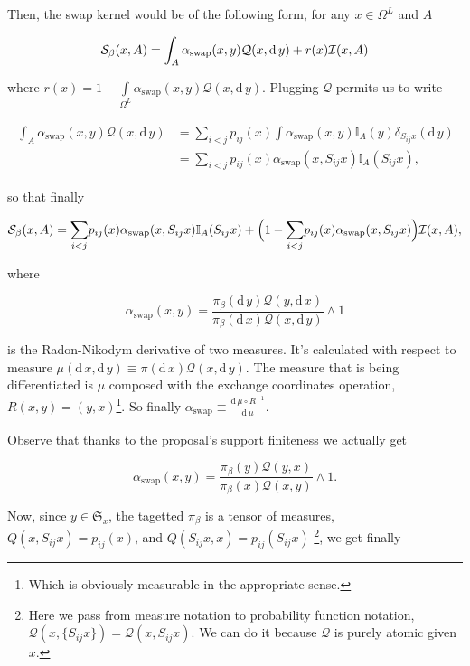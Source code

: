 \documentclass{article}
\begin{document}
Then, the swap kernel would be of the following form, for any $x \in \Omega^L$ and $A$

\begin{equation*}
	\mathcal{S}_{\beta}(x,A) = \int_{A} \alpha_\text{swap} (x,y) \mathcal{Q}(x, \mathrm{d}\,y) + r(x) \mathcal{I}(x,A)
\end{equation*}	

where $r(x) = 1 - \underset{\Omega^L}{\int} \alpha_\text{swap} (x,y) \mathcal{Q}(x, \mathrm{d}\,y) $. Plugging $\mathcal{Q}$ permits us to write

\begin{align*}
	\begin{split}
		\int_{A} \alpha_\text{swap} (x,y) \mathcal{Q}(x, \mathrm{d}\,y) &= \underset{ i < j}{\sum} p_{ij}(x) \int \alpha_\text{swap} (x,y) \mathbb{I}_A (y) \delta_{S_{ij}x}(\mathrm{d}\, y) \\ &= \underset{ i < j}{\sum} p_{ij}(x) \alpha_\text{swap} (x, S_{ij}x) \mathbb{I}_A(S_{ij} x),
	\end{split}
\end{align*}	

so that finally

\begin{equation*}
	\mathcal{S}_{\beta}(x,A) = \underset{ i < j}{\sum} p_{ij}(x) \alpha_\text{swap} (x, S_{ij}x) \mathbb{I}_A(S_{ij} x) + \Big( 1 - \underset{ i < j}{\sum} p_{ij}(x) \alpha_\text{swap} (x, S_{ij}x)\Big) \mathcal{I}(x,A),
\end{equation*}	

where 

	$$\alpha_\text{swap}(x,y) = \frac{\pi_\beta( \mathrm{d}\, y ) \mathcal{Q}(y, \mathrm{d}\,x)}{\pi_\beta( \mathrm{d}\, x ) \mathcal{Q}(x, \mathrm{d}\,y)} \wedge 1$$

is the Radon-Nikodym derivative of two measures. It's calculated with respect to measure $ \mu (\mathrm{d}\,x, \mathrm{d}\,y) \equiv \pi(\mathrm{d}\,x) \mathcal{Q}(x, \mathrm{d}\,y)$. The measure that is being differentiated is $\mu$ composed with the exchange coordinates operation, $R(x,y) = (y,x)$\footnote{Which is obviously measurable in the appropriate sense.}. So finally $\alpha_\text{swap} \equiv \frac{\mathrm{d}\, \mu \circ R^{-1}}{\mathrm{d}\, \mu}$.

Observe that thanks to the proposal's support finiteness we actually get 

	$$\alpha_\text{swap}(x,y) =  \frac{\pi_\beta( y ) \mathcal{Q}(y, x)}{\pi_\beta( x ) \mathcal{Q}(x, y)} \wedge 1.$$


Now, since $y \in \mathfrak{S}_x $, the tagetted $\pi_\beta$ is a tensor of measures, $Q(x, S_{ij} x) = p_{ij}(x)$, and $Q( S_{ij} x, x) = p_{ij}(S_{ij}x)$ \footnote{Here we pass from measure notation to probability function notation, $\mathcal{Q}(x, \{S_{ij}x \}) = \mathcal{Q}(x, S_{ij}x)$. We can do it because $\mathcal{Q}$ is purely atomic given $x$.}, we get finally 
\end{document}
